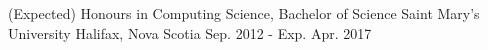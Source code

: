 

\begin{cventries}

  \cventry
    {(Expected) Honours in Computing Science, Bachelor of Science} %
    {Saint Mary's University} %
    {Halifax, Nova Scotia} %
    {Sep. 2012 - Exp. Apr. 2017} %
    {
    }

\end{cventries}
